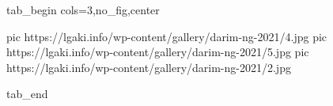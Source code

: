  
 
 
 
 


\ifcmt
  tab_begin cols=3,no_fig,center

     pic https://lgaki.info/wp-content/gallery/darim-ng-2021/4.jpg
		 pic https://lgaki.info/wp-content/gallery/darim-ng-2021/5.jpg
		 pic https://lgaki.info/wp-content/gallery/darim-ng-2021/2.jpg

  tab_end
\fi

